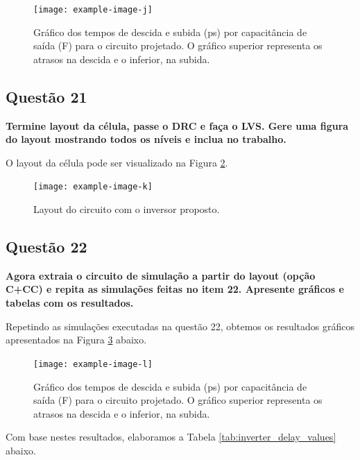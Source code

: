 \documentclass[12pt,a4paper]{article}
\begin{document}
\begin{figure}[H]
    \centering
    \texttt{[image: example-image-j]}
    \caption{Gráfico dos tempos de descida e subida (ps) por capacitância de saída (F) para o circuito projetado. O gráfico superior representa os atrasos na descida e o inferior, na subida.}
    \label{fig:inverter_delay_graphs}
\end{figure}

\subsection*{Questão 21}

	\textbf{Termine layout da célula, passe o DRC e faça o LVS. Gere uma figura do layout mostrando todos os níveis e inclua no trabalho.}

O layout da célula pode ser visualizado na Figura \ref{fig:cell_layout}.

\begin{figure}[H]
    \centering
    \texttt{[image: example-image-k]}
    \caption{Layout do circuito com o inversor proposto.}
    \label{fig:cell_layout}
\end{figure}

\subsection*{Questão 22}

	\textbf{Agora extraia o circuito de simulação a partir do layout (opção C+CC) e repita as simulações feitas no item 22. Apresente gráficos e tabelas com os resultados.}

Repetindo as simulações executadas na questão 22, obtemos os resultados gráficos apresentados na Figura \ref{fig:inverter_cc_delay_graphs} abaixo.

\begin{figure}[H]
    \centering
    \texttt{[image: example-image-l]}
    \caption{Gráfico dos tempos de descida e subida (ps) por capacitância de saída (F) para o circuito projetado. O gráfico superior representa os atrasos na descida e o inferior, na subida.}
    \label{fig:inverter_cc_delay_graphs}
\end{figure}

Com base nestes resultados, elaboramos a Tabela \ref{tab:inverter_delay_values} abaixo.
\end{document}
